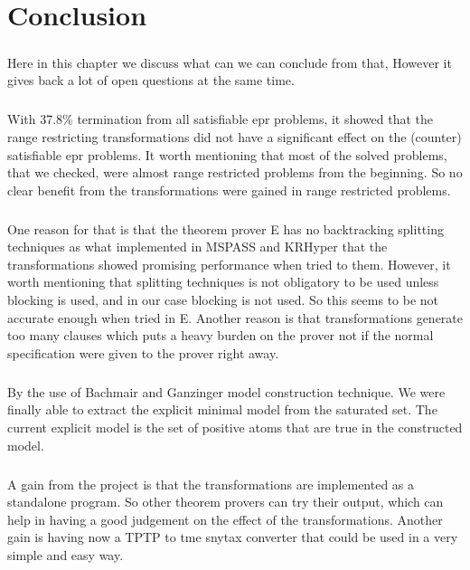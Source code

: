 \chapter{Conclusion}\label{chap:concl}
\paragraph{}
Here in this chapter we discuss what can we can conclude from that, However it gives back a lot of open questions at the same time.

\paragraph{}
With 37.8\% termination from all satisfiable \ac{epr} problems, it showed that the range restricting transformations did not have a significant effect on the (counter) satisfiable \ac{epr} problems. It worth mentioning that most of the solved problems, that we checked, were almost range restricted problems from the beginning. So no clear benefit from the transformations were gained in range restricted problems.

\paragraph{}
One reason for that is that the theorem prover E has no backtracking splitting techniques as what implemented in MSPASS and KRHyper that the transformations showed promising performance when tried to them. However, it worth mentioning that splitting techniques is not obligatory to be used unless blocking is used, and in our case blocking is not used. So this seems to be not accurate enough when tried in E. Another reason is that transformations generate too many clauses which puts a heavy burden on the prover not if the normal specification were given to the prover right away. 

\paragraph{}
By the use of Bachmair and Ganzinger model construction technique. We were finally able to extract the explicit minimal model from the saturated set. The current explicit model is the set of positive atoms that are true in the constructed model. 

\paragraph{}
A gain from the project is that the transformations are implemented as a standalone program. So other theorem provers can try their output, which can help in having a good judgement on the effect of the transformations. Another gain is having now a TPTP to tme snytax converter that could be used in a very simple and easy way.  

